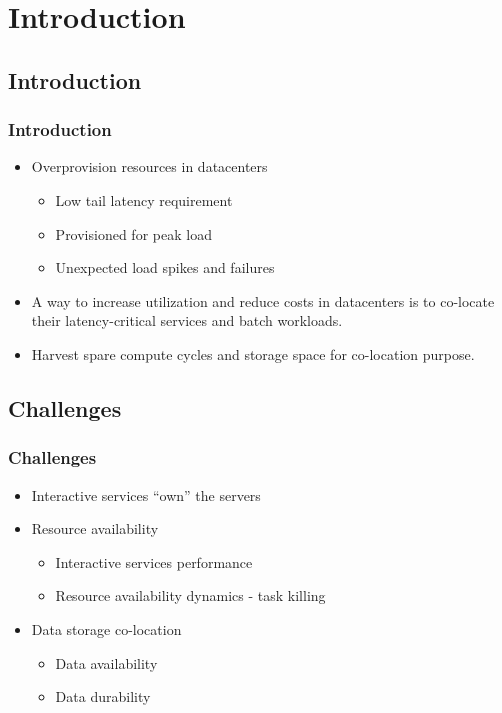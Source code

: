 \documentclass{beamer}
\begin{document}
\section{Introduction}

\subsection{Introduction}
    \begin{frame}
    \frametitle{Introduction}
		\begin{itemize}
		\item Overprovision resources in datacenters
			\begin{itemize}
			\item Low tail latency requirement
			\item Provisioned for peak load
			\item Unexpected load spikes and failures
			\end{itemize}
		\item A way to increase utilization and reduce costs in datacenters is to co-locate their latency-critical services and batch workloads.
		\item Harvest spare compute cycles and storage space for co-location purpose.
		\end{itemize}
    \end{frame}

\subsection{Challenges}
	\begin{frame}
	\frametitle{Challenges}
		\begin{itemize}
		\item Interactive services ``own'' the servers
		\item Resource availability
			\begin{itemize}
			\item Interactive services performance
			\item Resource availability dynamics - task killing
			\end{itemize}
		\item Data storage co-location
			\begin{itemize}
			\item Data availability
			\item Data durability
			\end{itemize}
		\end{itemize}
	\end{frame}
\end{document}
